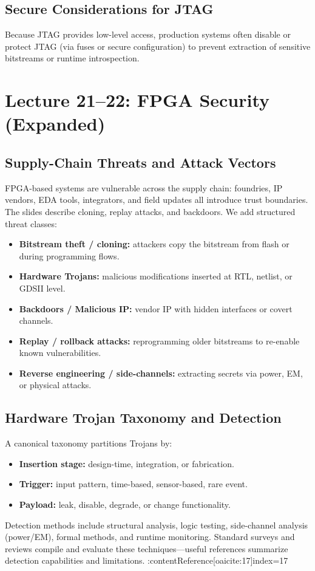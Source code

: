 \documentclass[11pt]{article}
\begin{document}
\subsection{Secure Considerations for JTAG}
Because JTAG provides low-level access, production systems often disable or protect JTAG (via fuses or secure configuration) to prevent extraction of sensitive bitstreams or runtime introspection.

\newpage

\section{Lecture 21–22: FPGA Security (Expanded)}

\subsection{Supply-Chain Threats and Attack Vectors}
FPGA-based systems are vulnerable across the supply chain: foundries, IP vendors, EDA tools, integrators, and field updates all introduce trust boundaries. The slides describe cloning, replay attacks, and backdoors. We add structured threat classes:
\begin{itemize}
  \item \textbf{Bitstream theft / cloning:} attackers copy the bitstream from flash or during programming flows.
  \item \textbf{Hardware Trojans:} malicious modifications inserted at RTL, netlist, or GDSII level.
  \item \textbf{Backdoors / Malicious IP:} vendor IP with hidden interfaces or covert channels.
  \item \textbf{Replay / rollback attacks:} reprogramming older bitstreams to re-enable known vulnerabilities.
  \item \textbf{Reverse engineering / side-channels:} extracting secrets via power, EM, or physical attacks. 
\end{itemize}

\subsection{Hardware Trojan Taxonomy and Detection}
A canonical taxonomy partitions Trojans by:
\begin{itemize}
  \item \textbf{Insertion stage:} design-time, integration, or fabrication.
  \item \textbf{Trigger:} input pattern, time-based, sensor-based, rare event.
  \item \textbf{Payload:} leak, disable, degrade, or change functionality.
\end{itemize}
Detection methods include structural analysis, logic testing, side-channel analysis (power/EM), formal methods, and runtime monitoring. Standard surveys and reviews compile and evaluate these techniques—useful references summarize detection capabilities and limitations. :contentReference[oaicite:17]{index=17}
\end{document}
